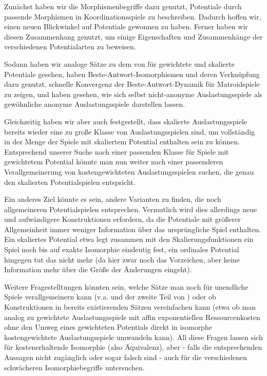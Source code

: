 \documentclass[a4paper,ngerman,11pt,bibliography=totoc]{scrartcl}
\theoremstyle{definition}
\theoremstyle{plain}
\theoremstyle{remark}
\begin{document}
Zunächst haben wir die Morphismenbegriffe dazu genutzt, Potentiale durch passende Morphismen in Koordinationsspiele zu beschreiben. Dadurch hoffen wir, einen neuen Blickwinkel auf Potentiale gewonnen zu haben. Ferner haben wir diesen Zusammenhang genutzt, um einige Eigenschaften und Zusammenhänge der verschiedenen Potentialarten zu beweisen.

Sodann haben wir analoge Sätze zu dem von \citeauthor{MonShap} für gewichtete und skalierte Potentiale gesehen, haben Beste-Antwort-Isomorphismen und deren Verknüpfung dazu genutzt, schnelle Konvergenz der Beste-Antwort-Dynamik für Matroidspiele zu zeigen, und haben gesehen, wie sich selbst nicht-anonyme Auslastungsspiele als gewöhnliche anonyme Auslastungsspiele darstellen lassen.

Gleichzeitig haben wir aber auch festgestellt, dass skalierte Auslastungsspiele bereits wieder eine zu große Klasse von Auslastungsspielen sind, um vollständig in der Menge der Spiele mit skaliertem Potential enthalten sein zu können. Entsprechend unserer Suche nach einer passenden Klasse für Spiele mit gewichtetem Potential könnte man nun weiter nach einer passenderen Verallgemeinerung von kostengewichteten Auslastungsspielen suchen, die genau den skalierten Potentialspielen entspricht. 

Ein anderes Ziel könnte es sein, andere Varianten zu finden, die noch allgemeineren Potentialspielen entsprechen. Vermutlich wird dies allerdings neue und aufwändigere Konstruktionen erfordern, da die Potentiale mit größerer Allgemeinheit immer weniger Information über das ursprüngliche Spiel enthalten. Ein skaliertes Potential etwa legt zusammen mit den Skalierungsfunktionen ein Spiel noch bis auf exakte Isomorphie eindeutig fest, ein ordinales Potential hingegen tut das nicht mehr (da hier zwar noch das Vorzeichen, aber keine Information mehr über die Größe der Änderungen eingeht).

Weitere Fragestelltungen könnten sein, welche Sätze man noch für unendliche Spiele verallgemeinern kann (v.a.  und der zweite Teil von ) oder ob Konstruktionen in bereits existierenden Sätzen vereinfachen kann (etwa ob man analog zu  gewichtete Auslastungsspiele mit affin exponentiellen Ressourcenkosten ohne den Umweg eines gewichteten Potentials direkt in isomorphe kostengewichtete Auslastungsspiele umwandeln kann). All diese Fragen lassen sich für kostenerhaltende Isomorphie (also Äquivalenz), aber - falls die entsprechenden Aussagen nicht zugänglich oder sogar falsch sind - auch für die verschiedenen schwächeren Isomorphiebegriffe untersuchen.

\newpage
\printbibliography
\end{document}
